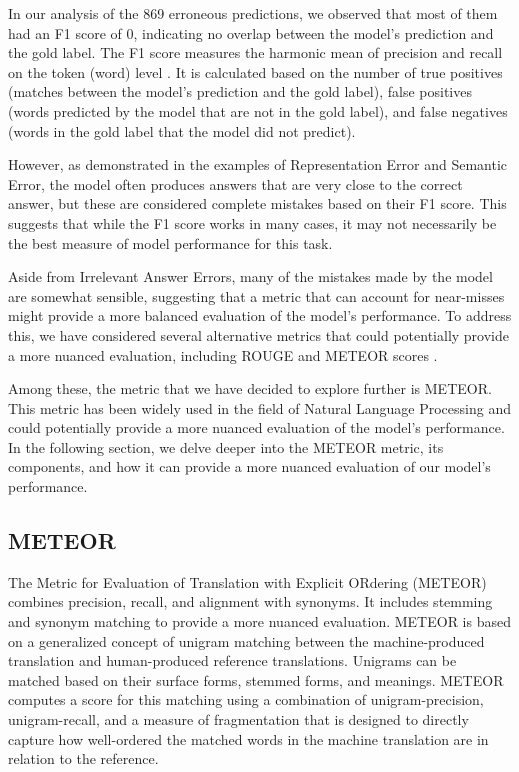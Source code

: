 \documentclass{article}
\begin{document}
In our analysis of the 869 erroneous predictions, we observed that most of them
had an F1 score of 0, indicating no overlap between the model's prediction and
the gold label. The F1 score measures the harmonic mean of precision and recall
on the token (word) level \cite{yacouby2020probabilistic}. It is calculated based on the number of true positives
(matches between the model's prediction and the gold label), false positives
(words predicted by the model that are not in the gold label), and false negatives
(words in the gold label that the model did not predict).

However, as demonstrated in the examples of Representation Error and Semantic
Error, the model often produces answers that are very close to the correct answer,
but these are considered complete mistakes based on their F1 score. This suggests
that while the F1 score works in many cases, it may not necessarily be the best
measure of model performance for this task.

Aside from Irrelevant Answer Errors, many of the mistakes made by the model are
somewhat sensible, suggesting that a metric that can account for near-misses
might provide a more balanced evaluation of the model's performance. To address this,
we have considered several alternative metrics that could potentially provide a more
nuanced evaluation, including ROUGE and METEOR scores \cite{lin2004rouge}.

Among these, the metric that we have decided to explore further is METEOR. This metric
has been widely used in the field of Natural Language Processing and could
potentially provide a more nuanced evaluation of the model's performance.
In the following section, we delve deeper into the METEOR metric, its components,
and how it can provide a more nuanced evaluation of our model's performance.

\subsection{METEOR}

The Metric for Evaluation of Translation with Explicit ORdering (METEOR)
\cite{banerjee2005meteor} combines precision, recall, and alignment with
synonyms. It includes stemming and synonym matching to provide a more
nuanced evaluation. METEOR is based on a generalized concept of unigram
matching between the machine-produced translation and human-produced
reference translations. Unigrams can be matched based on their surface
forms, stemmed forms, and meanings. METEOR computes a score for this
matching using a combination of unigram-precision, unigram-recall, and
a measure of fragmentation that is designed to directly capture how
well-ordered the matched words in the machine translation are in relation
to the reference.
\end{document}
